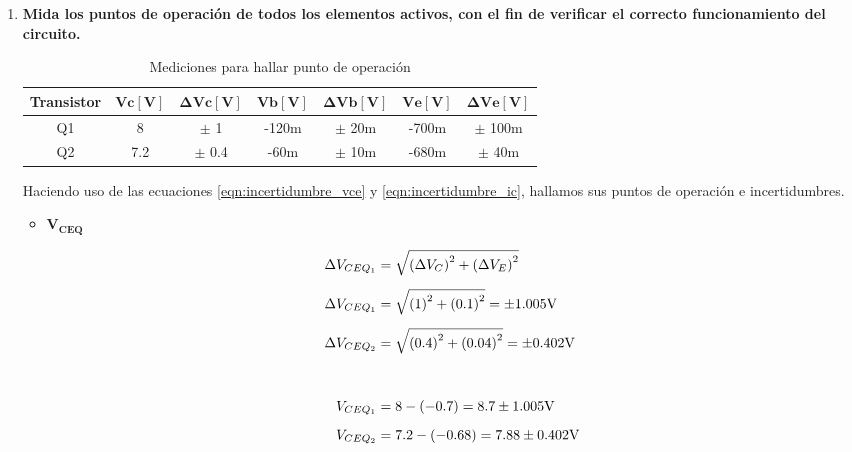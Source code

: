 \begin{enumerate}
  \item \textbf{Mida los puntos de operación de todos los elementos activos, con el fin de verificar el correcto funcionamiento del circuito.}

        \begin{table}[H]
          \centering
          \begin{tabular}{|c|c|c|c|c|c|c|}
            \hline
            \textbf{Transistor} & $\mathbf{Vc[V]}$ & $\mathbf{\Delta Vc[V]}$ & $\mathbf{Vb[V]}$ & $\mathbf{\Delta Vb[V]}$ & $\mathbf{Ve[V]}$ & $\mathbf{\Delta Ve[V]}$ \\
            \hline
            Q1                  & 8                & $\pm$ 1                 & -120m            & $\pm$ 20m               & -700m            & $\pm$ 100m              \\
            \hline
            Q2                  & 7.2              & $\pm$ 0.4               & -60m             & $\pm$ 10m               & -680m            & $\pm$ 40m               \\
            \hline
          \end{tabular}
          \caption{Mediciones para hallar punto de operación}
          \label{tab:pto_ope_ed}
        \end{table}
        Haciendo uso de las ecuaciones \ref{eqn:incertidumbre_vce} y \ref{eqn:incertidumbre_ic}, hallamos sus puntos de operación e incertidumbres.

        \begin{itemize}
          \item $\mathbf{V_{CEQ}}$

                \begin{align*}
                  \Delta V_{CEQ_1} & = \sqrt{\left(\Delta V_C\right)^2 + \left(\Delta V_E\right)^2}   \\[0.2cm]
                  \Delta V_{CEQ_1} & = \sqrt{\left(1\right)^2 + \left(0.1\right)^2}=\pm 1.005 \volt   \\[0.2cm]
                  \Delta V_{CEQ_2} & = \sqrt{\left(0.4\right)^2 + \left(0.04\right)^2}=\pm 0.402\volt \\[1cm]
                  V_{CEQ_1}        & =8-(-0.7)=8.7 \pm 1.005\volt                                     \\[0.2cm]
                  V_{CEQ_2}        & =7.2-(-0.68)=7.88 \pm 0.402\volt                                 \\[1cm]
                \end{align*}



\end{itemize}
\end{enumerate}
